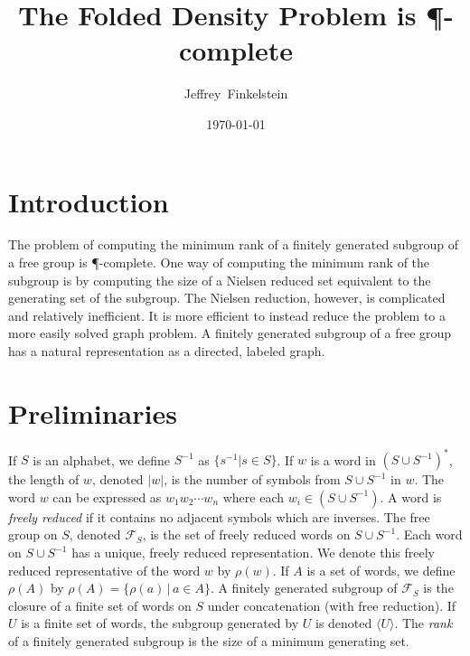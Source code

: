\documentclass{article}
\author{Jef{}frey~Finkelstein}
\title{The Folded Density Problem is \P-complete}
\date{\today}
\newcommand{\gen}[1]{\langle #1 \rangle}
\begin{document}
\maketitle

\abstract{}

\section{Introduction}

The problem of computing the minimum rank of a finitely generated subgroup of a free group is \P-complete.
One way of computing the minimum rank of the subgroup is by computing the size of a Nielsen reduced set equivalent to the generating set of the subgroup.
The Nielsen reduction, however, is complicated and relatively inefficient.
It is more efficient to instead reduce the problem to a more easily solved graph problem.
A finitely generated subgroup of a free group has a natural representation as a directed, labeled graph.

\section{Preliminaries}

If $S$ is an alphabet, we define $S^{-1}$ as $\{ s^{-1} | s \in S \}$.
If $w$ is a word in $(S \cup S^{-1})^*$, the length of $w$, denoted $|w|$, is the number of symbols from $S \cup S^{-1}$ in $w$.
The word $w$ can be expressed as $w_1w_2\cdots w_n$ where each $w_i \in (S \cup S^{-1})$.
A word is \emph{freely reduced} if it contains no adjacent symbols which are inverses.
The free group on $S$, denoted $\mathcal{F}_S$, is the set of freely reduced words on $S \cup S^{-1}$.
Each word on $S \cup S^{-1}$ has a unique, freely reduced representation.
We denote this freely reduced representative of the word $w$ by $\rho(w)$.
If $A$ is a set of words, we define $\rho(A)$ by $\rho(A) = \{ \rho(a) \, | \, a \in A\}$.
A finitely generated subgroup of $\mathcal{F}_S$ is the closure of a finite set of words on $S$ under concatenation (with free reduction).
If $U$ is a finite set of words, the subgroup generated by $U$ is denoted $\gen{U}$.
The \emph{rank} of a finitely generated subgroup is the size of a minimum generating set.
\end{document}
